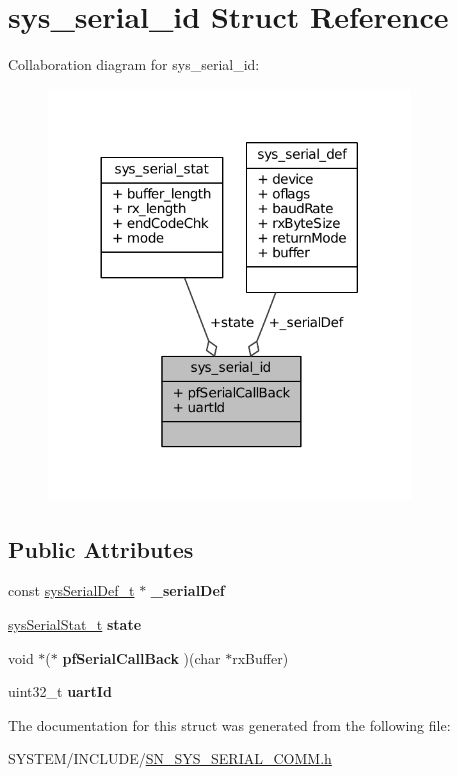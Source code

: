 \hypertarget{structsys__serial__id}{}\section{sys\+\_\+serial\+\_\+id Struct Reference}
\label{structsys__serial__id}


Collaboration diagram for sys\+\_\+serial\+\_\+id\+:\nopagebreak
\begin{figure}[H]
\begin{center}
\leavevmode
\includegraphics[width=272pt]{structsys__serial__id__coll__graph}
\end{center}
\end{figure}
\subsection*{Public Attributes}
\begin{DoxyCompactItemize}
\item 
\mbox{\label{structsys__serial__id_a871517d57cdee8c3d17c79ff942d1590}} 
const \hyperlink{structsys__serial__def}{sys\+Serial\+Def\+\_\+t} $\ast$ {\bfseries \+\_\+serial\+Def}
\item 
\mbox{\label{structsys__serial__id_a9f0d7f161757647b774e92b25fe02956}} 
\hyperlink{structsys__serial__stat}{sys\+Serial\+Stat\+\_\+t} {\bfseries state}
\item 
\mbox{\label{structsys__serial__id_a01e4caf41a2bb84168bdcd595d944dca}} 
void $\ast$($\ast$ {\bfseries pf\+Serial\+Call\+Back} )(char $\ast$rx\+Buffer)
\item 
\mbox{\label{structsys__serial__id_aac51b12503302e021b185a3310237b1e}} 
uint32\+\_\+t {\bfseries uart\+Id}
\end{DoxyCompactItemize}


The documentation for this struct was generated from the following file\+:\begin{DoxyCompactItemize}
\item 
S\+Y\+S\+T\+E\+M/\+I\+N\+C\+L\+U\+D\+E/\hyperlink{SN__SYS__SERIAL__COMM_8h}{S\+N\+\_\+\+S\+Y\+S\+\_\+\+S\+E\+R\+I\+A\+L\+\_\+\+C\+O\+M\+M.\+h}\end{DoxyCompactItemize}
